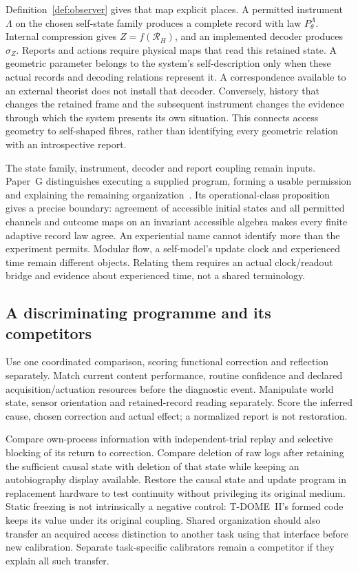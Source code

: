 \documentclass[12pt]{article}
\theoremstyle{definition}
\theoremstyle{remark}
\begin{document}
Definition~\ref{def:observer} gives that map explicit places.
A permitted instrument $\Lambda$ on the chosen self-state family
produces a complete record with law $P^\Lambda_\theta$.
Internal compression gives $Z=f(\mathcal R_H)$, and an implemented
decoder produces $\sigma_Z$. Reports and actions require physical
maps that read this retained state.
A geometric parameter belongs to the system's self-description only
when these actual records and decoding relations represent it.
A correspondence available to an external theorist does not install
that decoder. Conversely, history that changes the retained frame and
the subsequent instrument changes the evidence through which the
system presents its own situation. This connects access geometry to
self-shaped fibres, rather than identifying every geometric relation
with an introspective report.

The state family, instrument, decoder and report coupling remain inputs.
Paper~G distinguishes executing a supplied program, forming a usable
permission and explaining the remaining organization~\cite{PaperG}.
Its operational-class proposition gives a precise boundary:
agreement of accessible initial states and all permitted channels
and outcome maps on an invariant accessible algebra makes every
finite adaptive record law agree. An experiential name cannot
identify more than the experiment permits.
Modular flow, a self-model's update clock and experienced time remain
different objects. Relating them requires an actual clock/readout
bridge and evidence about experienced time, not a shared terminology.

\subsection{A discriminating programme and its competitors}

Use one coordinated comparison, scoring functional correction and
reflection separately. Match current content performance, routine
confidence and declared acquisition/actuation resources before the
diagnostic event. Manipulate world state, sensor orientation and
retained-record reading separately. Score the inferred cause,
chosen correction and actual effect; a normalized report is not
restoration.

Compare own-process information with independent-trial replay and
selective blocking of its return to correction.
Compare deletion of raw logs after retaining the sufficient causal
state with deletion of that state while keeping an autobiography
display available. Restore the causal state and update program in
replacement hardware to test continuity without privileging its
original medium. Static freezing is not intrinsically a negative
control: T-DOME~II's formed code keeps its value under its original
coupling. Shared organization should also transfer an acquired access
distinction to another task using that interface before new calibration.
Separate task-specific calibrators remain a competitor if they explain
all such transfer.
\end{document}
